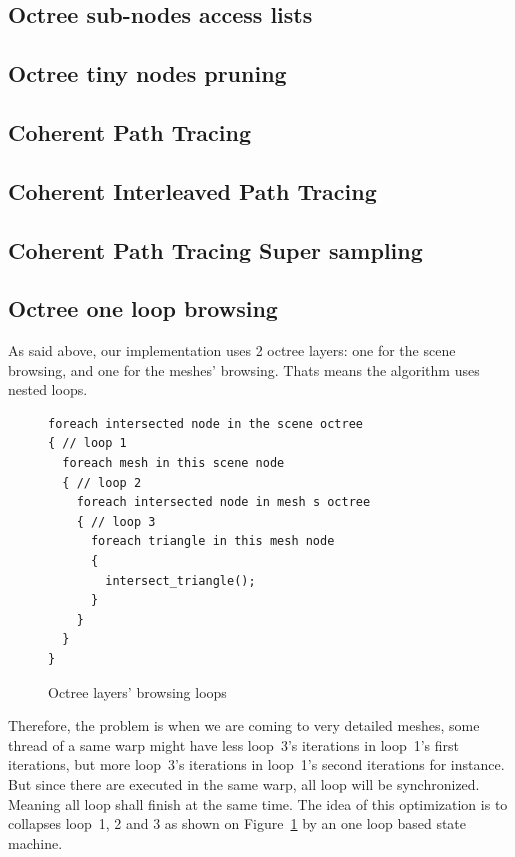 \documentclass[10pt,twocolumn,a4paper]{article}
\begin{document}
\subsection{Octree sub-nodes access lists}
\subsection{Octree tiny nodes pruning}
\subsection{Coherent Path Tracing}
\subsection{Coherent Interleaved Path Tracing}
\subsection{Coherent Path Tracing Super sampling}
\subsection{Octree one loop browsing}
As said above, our implementation uses 2 octree layers: one for the scene browsing,
and one for the meshes' browsing. Thats means the algorithm uses nested loops.
\begin{figure}[H]
    \centering
\begin{lstlisting}[morekeywords={foreach}]
foreach intersected node in the scene octree
{ // loop 1
  foreach mesh in this scene node
  { // loop 2
    foreach intersected node in mesh s octree
    { // loop 3
      foreach triangle in this mesh node
      {
        intersect_triangle();
      }
    }
  }
}
\end{lstlisting}
    \caption{Octree layers' browsing loops}
    \label{code:octree_layers_loops}
\end{figure}

Therefore, the problem is when we are coming to very detailed meshes, some thread
of a same warp might have less loop~3's iterations in loop~1's first iterations,
but more loop~3's iterations in loop~1's second iterations for instance. But since
there are executed in the same warp, all loop will be synchronized. Meaning all
loop shall finish at the same time. The idea of this optimization
is to collapses loop~1, 2 and 3 as shown on Figure~\ref{code:octree_layers_loops}
by an one loop based state machine.
\end{document}
